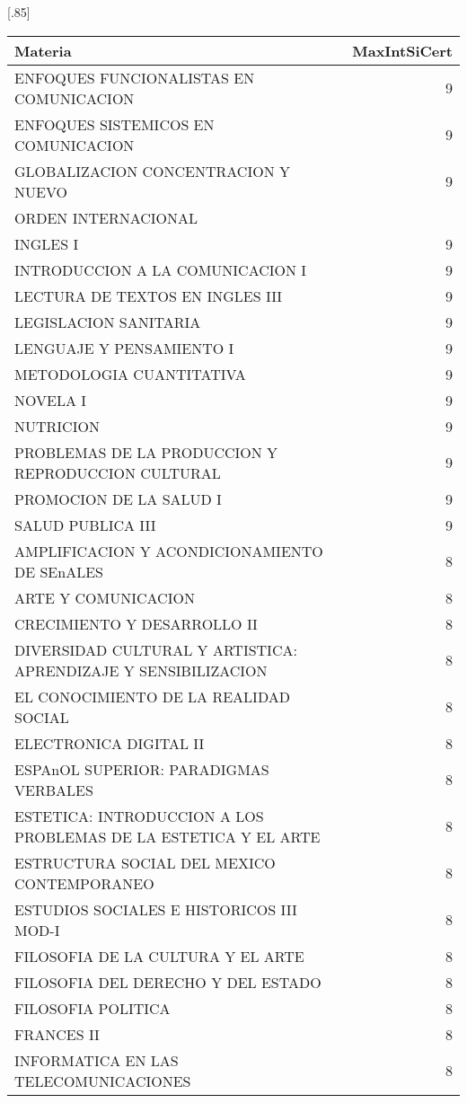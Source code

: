 \documentclass[12pt]{article}
\begin{document}
\begin{table}[ht]
\centering
\scalebox{0.75}[.85]{
\begin{tabular}{lr}
  \hline
  Materia & MaxIntSiCert \\ 
  \hline
  ENFOQUES FUNCIONALISTAS EN COMUNICACION & 9 \\ 
  ENFOQUES SISTEMICOS EN COMUNICACION & 9 \\ 
  GLOBALIZACION CONCENTRACION Y NUEVO & 9 \\ 
   ORDEN INTERNACIONAL & \\
  INGLES I & 9 \\ 
  INTRODUCCION A LA COMUNICACION I & 9 \\ 
  LECTURA DE TEXTOS EN INGLES III & 9 \\ 
  LEGISLACION SANITARIA & 9 \\ 
  LENGUAJE Y PENSAMIENTO I & 9 \\ 
  METODOLOGIA CUANTITATIVA & 9 \\ 
  NOVELA I & 9 \\ 
  NUTRICION & 9 \\ 
  PROBLEMAS DE LA PRODUCCION Y REPRODUCCION CULTURAL & 9 \\ 
  PROMOCION DE LA SALUD I & 9 \\ 
  SALUD PUBLICA III & 9 \\ 
  AMPLIFICACION Y ACONDICIONAMIENTO DE SEnALES & 8 \\ 
  ARTE Y COMUNICACION & 8 \\ 
  CRECIMIENTO Y DESARROLLO II & 8 \\ 
  DIVERSIDAD CULTURAL Y ARTISTICA: APRENDIZAJE Y SENSIBILIZACION & 8 \\ 
  EL CONOCIMIENTO DE LA REALIDAD SOCIAL & 8 \\ 
  ELECTRONICA DIGITAL II & 8 \\ 
  ESPAnOL SUPERIOR: PARADIGMAS VERBALES & 8 \\ 
  ESTETICA: INTRODUCCION A LOS PROBLEMAS DE LA ESTETICA Y EL ARTE & 8 \\ 
  ESTRUCTURA SOCIAL DEL MEXICO CONTEMPORANEO & 8 \\ 
  ESTUDIOS SOCIALES E HISTORICOS III MOD-I & 8 \\ 
  FILOSOFIA DE LA CULTURA Y EL ARTE & 8 \\ 
  FILOSOFIA DEL DERECHO Y DEL ESTADO & 8 \\ 
  FILOSOFIA POLITICA & 8 \\ 
  FRANCES II & 8 \\ 
  INFORMATICA EN LAS TELECOMUNICACIONES & 8 \\ 

\end{tabular}}
\end{table}
\end{document}
